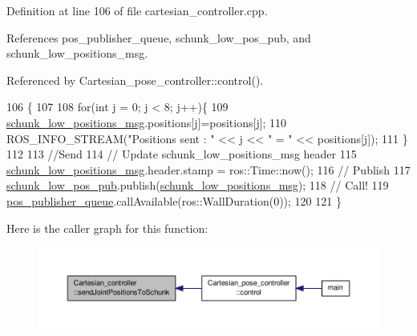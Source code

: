 Definition at line 106 of file cartesian\-\_\-controller.\-cpp.



References pos\-\_\-publisher\-\_\-queue, schunk\-\_\-low\-\_\-pos\-\_\-pub, and schunk\-\_\-low\-\_\-positions\-\_\-msg.



Referenced by Cartesian\-\_\-pose\-\_\-controller\-::control().


\begin{DoxyCode}
106                                                                                 \{
107 
108         \textcolor{keywordflow}{for}(\textcolor{keywordtype}{int} j = 0; j < 8; j++)\{
109                 \hyperlink{classCartesian__controller_a2dd700542bd6243eef10d34811055584}{schunk\_low\_positions\_msg}.positions[j]=positions[j];
110                 ROS\_INFO\_STREAM(\textcolor{stringliteral}{"Positions sent : "} << j << \textcolor{stringliteral}{" = "} << positions[j]);
111         \}
112 
113         \textcolor{comment}{//Send}
114         \textcolor{comment}{// Update schunk\_low\_positions\_msg header}
115         \hyperlink{classCartesian__controller_a2dd700542bd6243eef10d34811055584}{schunk\_low\_positions\_msg}.header.stamp = ros::Time::now();
116         \textcolor{comment}{// Publish}
117         \hyperlink{classCartesian__controller_af06313084ef058d1f979fddeb33d5100}{schunk\_low\_pos\_pub}.publish(\hyperlink{classCartesian__controller_a2dd700542bd6243eef10d34811055584}{schunk\_low\_positions\_msg});
118         \textcolor{comment}{// Call!}
119         \hyperlink{classCartesian__controller_adbb9cddf4092cba9042294740c5371eb}{pos\_publisher\_queue}.callAvailable(ros::WallDuration(0));
120 
121 \}
\end{DoxyCode}


Here is the caller graph for this function\-:\nopagebreak
\begin{figure}[H]
\begin{center}
\leavevmode
\includegraphics[width=350pt]{classCartesian__controller_ae845f67c81c2649bfbaccf95230f2599_icgraph}
\end{center}
\end{figure}



